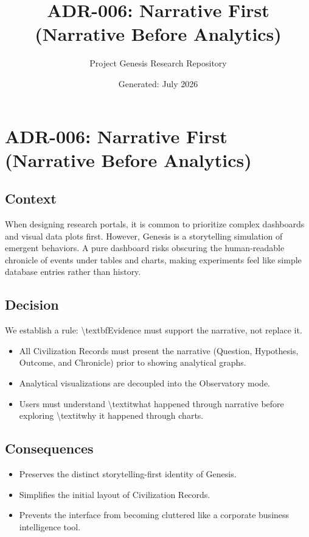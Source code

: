 \documentclass[11pt,a4paper]{article}
\title{\textbf{ADR-006: Narrative First (Narrative Before Analytics)}}
\author{Project Genesis Research Repository}
\date{\small Generated: July 2026}
\begin{document}
\maketitle
\thispagestyle{empty}

\newpage
\section*{ADR-006: Narrative First (Narrative Before Analytics)}

\subsection*{Context}
When designing research portals, it is common to prioritize complex dashboards and visual data plots first. However, Genesis is a storytelling simulation of emergent behaviors. A pure dashboard risks obscuring the human-readable chronicle of events under tables and charts, making experiments feel like simple database entries rather than history.

\subsection*{Decision}
We establish a rule: \textbackslash{}textbf{Evidence must support the narrative, not replace it.}
\begin{itemize}
  \item All Civilization Records must present the narrative (Question, Hypothesis, Outcome, and Chronicle) prior to showing analytical graphs.
  \item Analytical visualizations are decoupled into the Observatory mode.
  \item Users must understand \textbackslash{}textit{what} happened through narrative before exploring \textbackslash{}textit{why} it happened through charts.
\end{itemize}

\subsection*{Consequences}
\begin{itemize}
  \item Preserves the distinct storytelling-first identity of Genesis.
  \item Simplifies the initial layout of Civilization Records.
  \item Prevents the interface from becoming cluttered like a corporate business intelligence tool.
\end{itemize}
\end{document}
